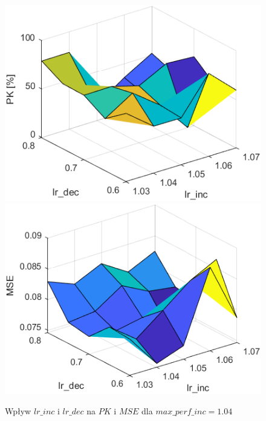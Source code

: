 \clearpage
\begin{figure}[!htb]
  \includegraphics[width = \linewidth]{Grafika/exp5/pk104.png}
\endminipage\hfill
{}
  \includegraphics[width = \linewidth]{Grafika/exp5/mse104.png}
\endminipage\hfill
\caption{Wpływ $lr\_inc$ i $lr\_dec$ na $PK$ i $MSE$ dla $max\_perf\_inc=1.04$}
\end{figure}


